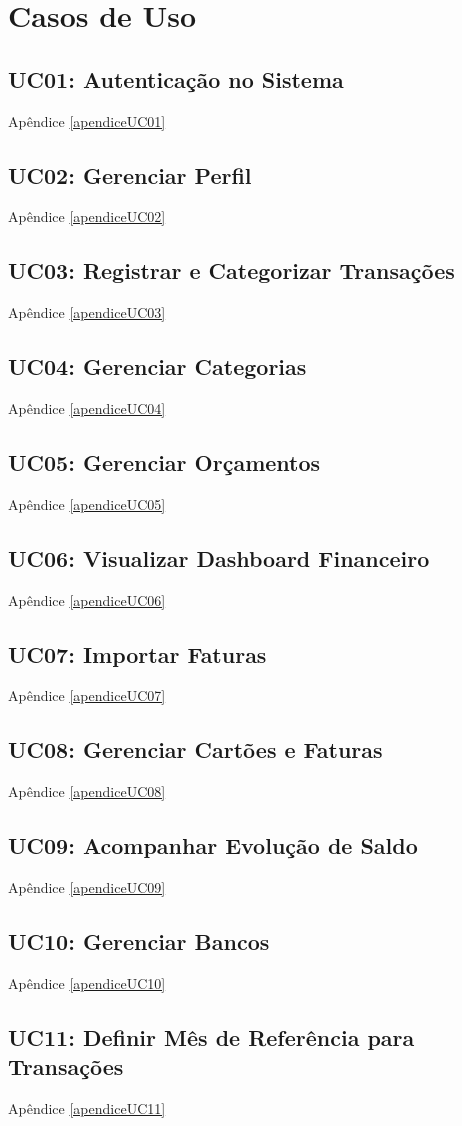 \section{Casos de Uso}

\subsection*{UC01: Autenticação no Sistema}
Apêndice \ref{apendiceUC01}

\subsection*{UC02: Gerenciar Perfil}
Apêndice \ref{apendiceUC02}

\subsection*{UC03: Registrar e Categorizar Transações}
Apêndice \ref{apendiceUC03}

\subsection*{UC04: Gerenciar Categorias}
Apêndice \ref{apendiceUC04}

\subsection*{UC05: Gerenciar Orçamentos}
Apêndice \ref{apendiceUC05}

\subsection*{UC06: Visualizar Dashboard Financeiro}
Apêndice \ref{apendiceUC06}

\subsection*{UC07: Importar Faturas}
Apêndice \ref{apendiceUC07}

\subsection*{UC08: Gerenciar Cartões e Faturas}
Apêndice \ref{apendiceUC08}

\subsection*{UC09: Acompanhar Evolução de Saldo}
Apêndice \ref{apendiceUC09}

\subsection*{UC10: Gerenciar Bancos}
Apêndice \ref{apendiceUC10}

\subsection*{UC11: Definir Mês de Referência para Transações}
Apêndice \ref{apendiceUC11}
